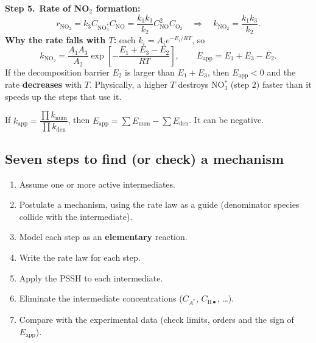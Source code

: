 \documentclass[11pt]{article}
\newcommand{\step}[1]{\par\smallskip\textcolor{stepgray}{\textbf{Step #1.}}\ }
\begin{document}
\step{5}\textbf{Rate of NO$_2$ formation:}
\[
r_{\mathrm{NO_2}}=k_3C_{\mathrm{NO_3^*}}C_{\mathrm{NO}}=\frac{k_1k_3}{k_2}C_{\mathrm{NO}}^2C_{\mathrm{O_2}}
\quad\Rightarrow\quad k_{\mathrm{NO_2}}=\frac{k_1k_3}{k_2}.
\]
\textbf{Why the rate falls with $T$:} each $k_i=A_ie^{-E_i/RT}$, so
\[
k_{\mathrm{NO_2}}=\frac{A_1A_3}{A_2}\exp\!\left[-\frac{E_1+E_3-E_2}{RT}\right],\qquad
E_{\text{app}}=E_1+E_3-E_2 .
\]
If the decomposition barrier $E_2$ is larger than $E_1+E_3$, then $E_{\text{app}}<0$ and the rate \textbf{decreases} with $T$.
Physically, a higher $T$ destroys NO$_3^*$ (step 2) faster than it speeds up the steps that use it.

\begin{center}
\end{center}

\begin{keyresult}
If $k_{\text{app}}=\dfrac{\prod k_{\text{num}}}{\prod k_{\text{den}}}$, then
$E_{\text{app}}=\sum E_{\text{num}}-\sum E_{\text{den}}$. It can be negative.
\end{keyresult}

\subsection{Seven steps to find (or check) a mechanism}
\begin{enumerate}
\item Assume one or more active intermediates.
\item Postulate a mechanism, using the rate law as a guide (denominator species collide with the intermediate).
\item Model each step as an \textbf{elementary} reaction.
\item Write the rate law for each step.
\item Apply the PSSH to each intermediate.
\item Eliminate the intermediate concentrations ($C_{A^*}$, $C_{\mathrm{H}\bullet}$, \ldots).
\item Compare with the experimental data (check limits, orders and the sign of $E_{\text{app}}$).
\end{enumerate}
\end{document}
